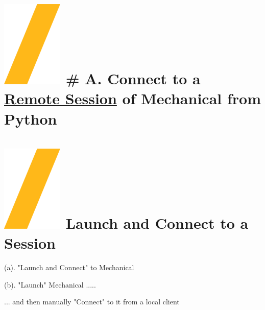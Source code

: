 \documentclass[9pt,landscape]{article}
\begin{document}
\begin{multicols}{3}
\setlength{\premulticols}{1pt}
\setlength{\postmulticols}{1pt}
\setlength{\multicolsep}{1pt}
\setlength{\columnsep}{2pt}

\vfill
\section{\includegraphics[height=\fontcharht\font`\S]{slash.png} # A. Connect to a \underline{Remote Session} of Mechanical from Python}


\section{\includegraphics[height=\fontcharht\font`\S]{slash.png} Launch and Connect to a Session}

(a). "Launch and Connect" to Mechanical


(b). "Launch" Mechanical .....


... and then  manually "Connect" to it from a local client





\end{multicols}
\end{document}
